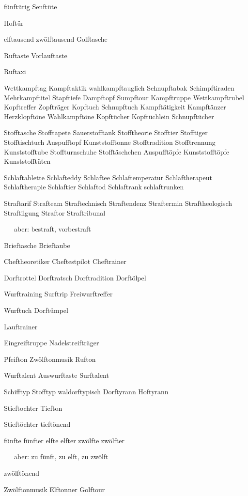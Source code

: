 fünftürig Senftüte

Hoftür

elftausend zwölftausend Golftasche

Ruftaste Vorlauftaste

Ruftaxi

Wettkampftag Kampftaktik 
wahlkampftauglich Schnupftabak
Schimpftiraden Mehrkampftitel Stapftiefe
Dampftopf Sumpftour
Kampftruppe Wettkampftrubel
Kopftreffer Zopfträger
Kopftuch Schnupftuch
Kampftätigkeit Kampftänzer
Herzklopftöne Wahlkampftöne
Kopftücher Kopftüchlein Schnupftücher

Stofftasche Stofftapete Sauerstofftank
Stofftheorie
Stofftier Stofftiger Stofftischtuch
Auspufftopf Kunststofftonne
Stofftradition Stofftrennung
Kunststofftube Stoffturnschuhe
Stofftäschchen
Auspufftöpfe Kunststofftöpfe
Kunststofftüten


Schlaftablette Schlafteddy Schlaftee Schlaftemperatur 
Schlaftherapeut Schlaftherapie Schlaftier Schlaftod 
Schlaftrank schlaftrunken

Straftarif Strafteam Straftechnisch Straftendenz
Straftermin Straftheologisch Straftilgung 
Straftor Straftribunal

\ \ \ aber: bestraft, vorbestraft

Brieftasche Brieftaube

Cheftheoretiker Cheftestpilot Cheftrainer

Dorftrottel Dorftratsch Dorftradition Dorftölpel

Wurftraining Surftrip Freiwurftreffer

Wurftuch Dorftümpel

Lauftrainer

Eingreiftruppe Nadelstreifträger

Pfeifton Zwölftonmusik Rufton

Wurftalent Auswurftaste Surftalent


Schifftyp Stofftyp waldorftypisch Dorftyrann Hoftyrann 

Stieftochter Tiefton

Stieftöchter tieftönend

fünfte fünfter elfte elfter zwölfte zwölfter

\ \ \ aber: zu fünft, zu elft, zu zwölft

zwölftönend

Zwölftonmusik Elftonner Golftour

